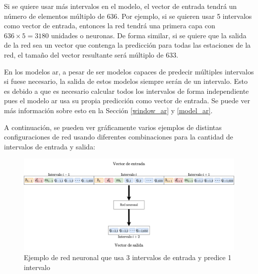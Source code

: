 Si se quiere usar más intervalos en el modelo, el vector de entrada tendrá un número de elementos múltiplo de $636$. Por ejemplo, si se quieren usar 5 intervalos como vector de entrada, entonces la red tendrá una primera capa con $636 \times 5 = 3180$ unidades o neuronas. De forma similar, si se quiere que la salida de la red sea un vector que contenga la predicción para todas las estaciones de la red, el tamaño del vector resultante será múltiplo de $633$. 
\newline

En los modelos \acrfull{ar}, a pesar de ser modelos capaces de predecir múltiples intervalos si fuese necesario, la salida de estos modelos siempre serán de un intervalo. Esto es debido a que es necesario calcular todos los intervalos de forma independiente pues el modelo \acrshort{ar} usa su propia predicción como vector de entrada. Se puede ver más información sobre esto en la Sección \ref{window_ar} y \ref{model_ar}.
\newline

A continuación, se pueden ver gráficamente varios ejemplos de distintas configuraciones de red usando diferentes combinaciones para la cantidad de intervalos de entrada y salida:


\begin{figure}[H]
    \centering
    \includegraphics[width=14cm]{images/solution/preprocessing/models-design-1.png}
    \caption{Ejemplo de red neuronal que usa 3 intervalos de entrada y predice 1 intervalo}
    \label{fig:models-design-1}
\end{figure}

